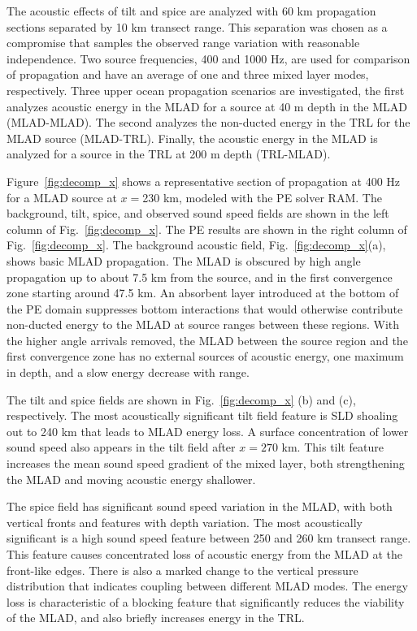 \documentclass[preprint,NumberedRefs]{JASA}
\begin{document}
The acoustic effects of tilt and spice are analyzed with 60 km propagation sections separated by 10 km transect range. This separation was chosen as a compromise that samples the observed range variation with reasonable independence. Two source frequencies, 400 and 1000 Hz, are used for comparison of propagation and have an average of one and three mixed layer modes, respectively. Three upper ocean propagation scenarios are investigated, the first analyzes acoustic energy in the MLAD for a source at 40 m depth in the MLAD (MLAD-MLAD). The second analyzes the non-ducted energy in the TRL for the MLAD source (MLAD-TRL). Finally, the acoustic energy in the MLAD is analyzed for a source in the TRL at 200 m depth (TRL-MLAD).

Figure~\ref{fig:decomp_x} shows a representative section of propagation at 400 Hz for a MLAD source at $x=$230 km, modeled with the PE solver RAM\citep{collins93}. The background, tilt, spice, and observed sound speed fields are shown in the left column of Fig.~\ref{fig:decomp_x}. The PE results are shown in the right column of Fig.~\ref{fig:decomp_x}. The background acoustic field, Fig.~\ref{fig:decomp_x}(a), shows basic MLAD propagation. The MLAD is obscured by high angle propagation up to about 7.5 km from the source, and in the first convergence zone starting around 47.5 km. An absorbent layer introduced at the bottom of the PE domain suppresses bottom interactions that would otherwise contribute non-ducted energy to the MLAD at source ranges between these regions. With the higher angle arrivals removed, the MLAD between the source region and the first convergence zone has no external sources of acoustic energy, one maximum in depth, and a slow energy decrease with range.

The tilt and spice fields are shown in Fig.~\ref{fig:decomp_x} (b) and (c), respectively. The most acoustically significant tilt field feature is SLD shoaling out to 240 km that leads to MLAD energy loss. A surface concentration of lower sound speed also appears in the tilt field after $x=270$ km. This tilt feature increases the mean sound speed gradient of the mixed layer, both strengthening the MLAD and moving acoustic energy shallower.

The spice field has significant sound speed variation in the MLAD, with both vertical fronts and features with depth variation. The most acoustically significant is a high sound speed feature between 250 and 260 km transect range. This feature causes concentrated loss of acoustic energy from the MLAD at the front-like edges. There is also a marked change to the vertical pressure distribution that indicates coupling between different MLAD modes. The energy loss is characteristic of a blocking feature that significantly reduces the viability of the MLAD, and also briefly increases energy in the TRL.
\end{document}
